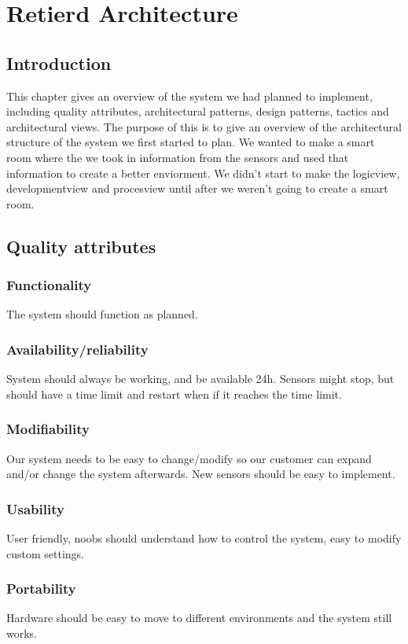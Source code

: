 \documentclass[../document]{subfiles}
\begin{document}
\section{Retierd Architecture}
\subsection{Introduction}
This chapter gives an overview of the system we had planned to implement, including quality attributes, architectural patterns, design patterns, tactics and architectural views. The purpose of this is to give an overview of the architectural structure of the system we first started to plan. We wanted to make a smart room where the we took in information from the sensors and used that information to create a better enviorment. We didn't start to make the logicview, developmentview and procesview until after we weren't going to create a smart room.

\subsection{Quality attributes}
\subsubsection{Functionality}
The system should function as planned. 

\subsubsection{Availability/reliability}
System should always be working, and be available 24h. Sensors might stop, but should have a time limit and restart when if it reaches the time limit. 

\subsubsection{Modifiability}
Our system needs to be easy to change/modify so our customer can expand and/or change the system afterwards. New sensors should be easy to implement.

\subsubsection{Usability}
User friendly, noobs should understand how to control the system, easy to modify custom settings.

\subsubsection{Portability}
Hardware should be easy to move to different environments and the system still works.
\end{document}
